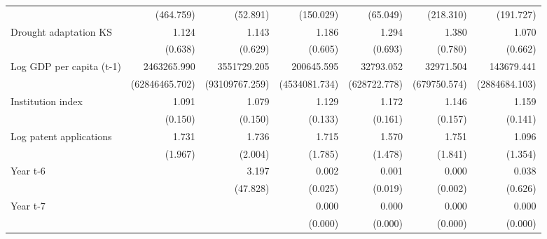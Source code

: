 \begin{table}[htbp]
\begin{tabular}{l*{6}{D{.}{.}{-1}}}
                    &   (464.759)         &    (52.891)         &   (150.029)         &    (65.049)         &   (218.310)         &   (191.727)         \\
\addlinespace
Drought adaptation KS&       1.124         &       1.143         &       1.186         &       1.294         &       1.380         &       1.070         \\
                    &     (0.638)         &     (0.629)         &     (0.605)         &     (0.693)         &     (0.780)         &     (0.662)         \\
\addlinespace
Log GDP per capita (t-1)& 2463265.990         & 3551729.205         &  200645.595         &   32793.052         &   32971.504         &  143679.441         \\
                    &(62846465.702)         &(93109767.259)         &(4534081.734)         &(628722.778)         &(679750.574)         &(2884684.103)         \\
\addlinespace
Institution index   &       1.091         &       1.079         &       1.129         &       1.172         &       1.146         &       1.159         \\
                    &     (0.150)         &     (0.150)         &     (0.133)         &     (0.161)         &     (0.157)         &     (0.141)         \\
\addlinespace
Log patent applications&       1.731         &       1.736         &       1.715         &       1.570         &       1.751         &       1.096         \\
                    &     (1.967)         &     (2.004)         &     (1.785)         &     (1.478)         &     (1.841)         &     (1.354)         \\
\addlinespace
Year t-6            &                     &       3.197         &       0.002         &       0.001         &       0.000         &       0.038         \\
                    &                     &    (47.828)         &     (0.025)         &     (0.019)         &     (0.002)         &     (0.626)         \\
\addlinespace
Year t-7            &                     &                     &       0.000         &       0.000         &       0.000         &       0.000         \\
                    &                     &                     &     (0.000)         &     (0.000)         &     (0.000)         &     (0.000)         \\

\end{tabular}
\end{table}
